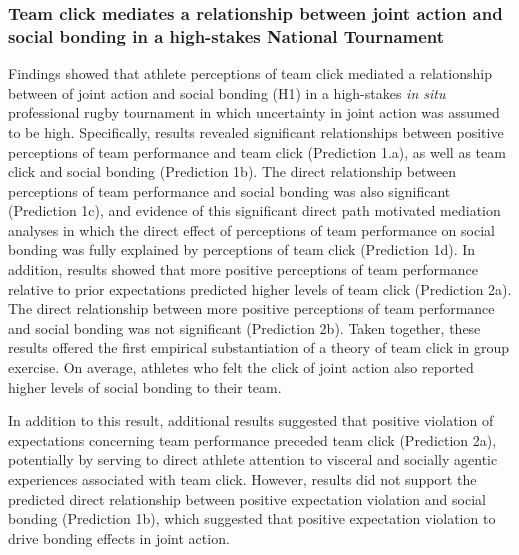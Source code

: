 \subsubsection{Team click mediates a relationship between joint action and social bonding in a high-stakes National Tournament}
Findings showed that athlete perceptions of team click mediated a relationship between of joint action and social bonding (H1) in a high-stakes \textit{in situ} professional rugby tournament in which uncertainty in joint action was assumed to be high.  Specifically, results revealed significant relationships between positive perceptions of team performance and team click (Prediction 1.a), as well as team click and social bonding (Prediction 1b).  The direct relationship between perceptions of team performance and social bonding was also significant (Prediction 1c), and evidence of this significant direct path motivated mediation analyses in which the direct effect of perceptions of team performance on social bonding was fully explained by perceptions of team click (Prediction 1d).  In addition, results showed that more positive perceptions of team performance relative to prior expectations predicted higher levels of team click (Prediction 2a).  The direct relationship between more positive perceptions of team performance and social bonding was not significant (Prediction 2b).  Taken together, these results offered the first empirical substantiation of a theory of team click in group exercise. On average, athletes who felt the click of joint action also reported higher levels of social bonding to their team.

In addition to this result, additional results suggested that positive violation of expectations concerning team performance preceded team click (Prediction 2a), potentially by serving to direct athlete attention to visceral and socially agentic experiences associated with team click.  However, results did not support the predicted direct relationship between positive expectation violation and social bonding (Prediction 1b), which suggested that positive expectation violation to drive bonding effects in joint action.


